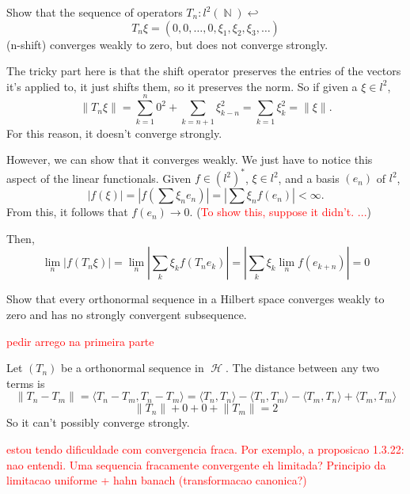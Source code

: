 \documentclass{article}
\theoremstyle{exercisestyle}
\newenvironment{exercise}[1]
  {\renewcommand\theinnerex{#1}\innerex}
  {\endinnerex}
\DeclareMathOperator{\Natural}{\mathbb{N}}
\DeclareMathOperator{\hilbert}{\mathcal{H}}
\newcommand{\norm}[1]{\lVert #1 \rVert}
\newcommand{\inner}[2]{\langle #1, #2 \rangle}
\begin{document}
\begin{exercise}{1.3.19}
    Show that the sequence of operators $T_n : l^2 (\Natural) \hookleftarrow$
    $$ T_n \xi = \left(0, 0, \dots, 0, \xi_{1} , \xi_{2} , \xi_{3}, \dots \right)$$
    (n-shift) converges weakly to zero, but does not converge strongly.

    The tricky part here is that the shift operator preserves the entries of the vectors it's applied to, it just shifts them, so it preserves the norm.
    So if given a $\xi \in l^2$,
    $$ \norm{T_n \xi} = \sum_{k=1}^n 0^2 +  \sum_{k=n+1} \xi_{k-n}^2 = \sum_{k=1}\xi_k^2 = \norm{\xi}.$$
    For this reason, it doesn't converge strongly.

    However, we can show that it converges weakly. We just have to notice this aspect of the linear functionals. Given $f \in (l^2)^*$, $\xi \in l^2$, and a basis $(e_n)$ of $l^2$,
    $$ |f(\xi)| = |f(\sum \xi_n e_n)| = |\sum \xi_n f(e_n)| < \infty.$$
    From this, it follows that $f(e_n) \to 0$. (\textcolor{red}{To show this, suppose it didn't. ...})

    Then,
    $$ \lim_n |f(T_n \xi)| = \lim_n |\sum_k \xi_k f(T_n e_k)| = |\sum_k \xi_k \lim_n f(e_{k+n})| = 0$$


\end{exercise}

\begin{exercise}{1.3.21}
    Show that every orthonormal sequence in a Hilbert space converges weakly to zero and has no strongly convergent subsequence.

    \textcolor{red}{pedir arrego na primeira parte}

    Let $(T_n)$ be a orthonormal sequence in $\hilbert$. The distance between any two terms is
    $$\norm{T_n - T_m} = \inner{T_n - T_m}{T_n - T_m} = \inner{T_n}{T_n} - \inner{T_n}{T_m} - \inner{T_m}{T_n} + \inner{T_m}{T_m}$$
    $$ \norm{T_n} + 0 + 0 + \norm{T_m} = 2$$
    So it can't possibly converge strongly.

    \textcolor{red}{estou tendo dificuldade com convergencia fraca. Por exemplo, a proposicao 1.3.22: nao entendi. Uma sequencia fracamente convergente eh limitada?
        Principio da limitacao uniforme + hahn banach (transformacao canonica?)}




\end{exercise}
\end{document}
